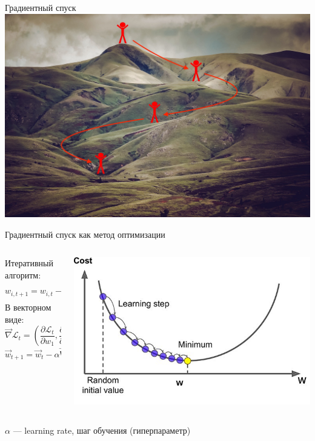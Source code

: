 \documentclass[aspectratio=169]{beamer}
\begin{document}
\begin{frame}{Градиентный спуск}
    \centering
	\includegraphics[width=.7\linewidth]{figures/fig4.jpg}
\end{frame}

\begin{frame}{Градиентный спуск как метод оптимизации}
		\begin{columns}
			\begin{column}{.35\linewidth}
                Итеративный алгоритм:
                \[ w_{i, t+1} = w_{i, t} - \alpha \frac{\partial \mathcal{L}_t}{\partial w_i} \]
                В векторном виде:
                \[
                    \vec{\nabla} \mathcal{L}_t = \left(
                    \frac{\partial \mathcal{L}_t}{\partial w_1},
                    \frac{\partial \mathcal{L}_t}{\partial w_2},
                    \cdots
                    \right)
                \]
                \[ \vec{w}_{t+1} = \vec{w}_t - \alpha \vec{\nabla} \mathcal{L}_t \]
			\end{column}
			\begin{column}{.6\linewidth}
				\centering
				\includegraphics[width=\linewidth]{figures/fig5.jpg}
			\end{column}
		\end{columns}
	\centering
	\(\alpha\) --- learning rate, шаг обучения (гиперпараметр)
\end{frame}
\end{document}
